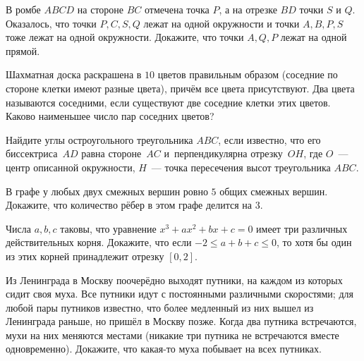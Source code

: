 \resetproblem \begingroup %
    \def\jeolmdate{28 ноября 2018 г.}%
    \def\jeolmauthors{Орлов О.\,П., Тихонов Ю.\,В.}%
\jeolmheader \endgroup


\begin{problems}

\item В ромбе $ABCD$ на стороне $BC$ отмечена точка $P$, а на отрезке $BD$ точки $S$ и $Q$. Оказалось, что точки $P, C, S, Q$ лежат на одной окружности и точки $A, B, P, S$ тоже лежат на одной окружности. Докажите, что точки $A, Q, P$ лежат на одной прямой.

\item Шахматная доска раскрашена в $10$ цветов правильным образом (соседние по стороне клетки
имеют разные цвета), причём все цвета присутствуют. Два цвета называются соседними, если
существуют две соседние клетки этих цветов. Каково наименьшее число пар соседних цветов?

\item
Найдите углы остроугольного треугольника $ABC$, если известно, что его
биссектриса~$AD$ равна стороне~$AC$ и~перпендикулярна отрезку~$OH$, где $O$~---
центр описанной окружности, $H$~--- точка пересечения высот треугольника $ABC$.

\item В графе у любых двух смежных вершин ровно $5$ общих смежных вершин. Докажите, что количество рёбер в этом графе делится на $3$.

\item Числа $a, b, c$ таковы, что уравнение $x^3 + ax^2 + bx + c = 0$ имеет три различных действительных корня. Докажите, что если $-2 \leqslant a + b + c \leqslant 0$, то хотя бы один из этих корней принадлежит отрезку $[0, 2]$.

\item Из Ленинграда в Москву поочерёдно выходят путники, на каждом из которых сидит своя муха.
Все путники идут с постоянными различными скоростями; для любой пары путников известно,
что более медленный из них вышел из Ленинграда раньше, но пришёл в Москву позже. Когда
два путника встречаются, мухи на них меняются местами (никакие три путника не встречаются
вместе одновременно). Докажите, что какая-то муха побывает на всех путниках.



\end{problems}

